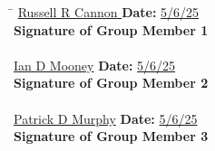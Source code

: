 \documentclass{article}
\begin{document}
\begin{tabbing}
\hspace{8cm}\=\kill
\underline{\hspace{1cm} Russell R Cannon \hspace{1cm}} \> \textbf{Date:} \underline{\hspace{1cm} 5/6/25 \hspace{1cm}} \\
\textbf{Signature of Group Member 1} \\
\\
\underline{\hspace{1cm} Ian D Mooney\hspace{1cm}} \> \textbf{Date:} \underline{\hspace{1cm} 5/6/25 \hspace{1cm}} \\
\textbf{Signature of Group Member 2} \\
\\
\underline{\hspace{1cm} Patrick D Murphy\hspace{1cm}} \> \textbf{Date:} \underline{\hspace{1cm} 5/6/25 \hspace{1cm}} \\
\textbf{Signature of Group Member 3} \\
\\
\end{tabbing}
\end{document}
